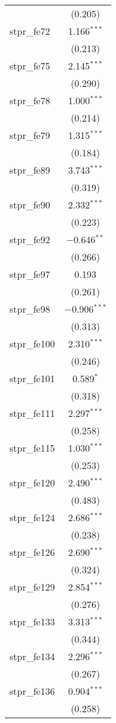 \begin{table}[!htbp]
\begin{tabular}{@{\extracolsep{5pt}}lc}
  & (0.205) \\ 
  stpr\_fe72 & 1.166$^{***}$ \\ 
  & (0.213) \\ 
  stpr\_fe75 & 2.145$^{***}$ \\ 
  & (0.290) \\ 
  stpr\_fe78 & 1.000$^{***}$ \\ 
  & (0.214) \\ 
  stpr\_fe79 & 1.315$^{***}$ \\ 
  & (0.184) \\ 
  stpr\_fe89 & 3.743$^{***}$ \\ 
  & (0.319) \\ 
  stpr\_fe90 & 2.332$^{***}$ \\ 
  & (0.223) \\ 
  stpr\_fe92 & $-$0.646$^{**}$ \\ 
  & (0.266) \\ 
  stpr\_fe97 & 0.193 \\ 
  & (0.261) \\ 
  stpr\_fe98 & $-$0.906$^{***}$ \\ 
  & (0.313) \\ 
  stpr\_fe100 & 2.310$^{***}$ \\ 
  & (0.246) \\ 
  stpr\_fe101 & 0.589$^{*}$ \\ 
  & (0.318) \\ 
  stpr\_fe111 & 2.297$^{***}$ \\ 
  & (0.258) \\ 
  stpr\_fe115 & 1.030$^{***}$ \\ 
  & (0.253) \\ 
  stpr\_fe120 & 2.490$^{***}$ \\ 
  & (0.483) \\ 
  stpr\_fe124 & 2.686$^{***}$ \\ 
  & (0.238) \\ 
  stpr\_fe126 & 2.690$^{***}$ \\ 
  & (0.324) \\ 
  stpr\_fe129 & 2.854$^{***}$ \\ 
  & (0.276) \\ 
  stpr\_fe133 & 3.313$^{***}$ \\ 
  & (0.344) \\ 
  stpr\_fe134 & 2.296$^{***}$ \\ 
  & (0.267) \\ 
  stpr\_fe136 & 0.904$^{***}$ \\ 
  & (0.258) \\ 

\end{tabular}
\end{table}
